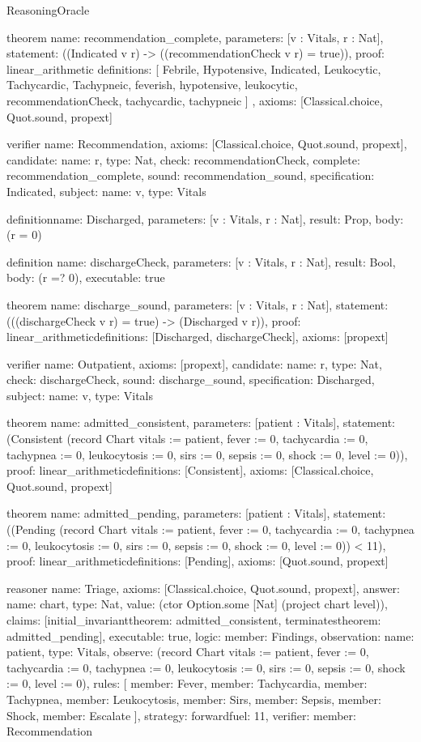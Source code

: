 \begin{lexlean}{ReasoningOracle}
\begin{semanticmodule}
theorem{
  name: recommendation_complete,
  parameters: [v : Vitals, r : Nat],
  statement: ((Indicated v r) -> ((recommendationCheck v r) = true)),
  proof: linear_arithmetic{
    definitions: [
      Febrile,
      Hypotensive,
      Indicated,
      Leukocytic,
      Tachycardic,
      Tachypneic,
      feverish,
      hypotensive,
      leukocytic,
      recommendationCheck,
      tachycardic,
      tachypneic
    ]
  },
  axioms: [Classical.choice, Quot.sound, propext]
}

verifier{
  name: Recommendation,
  axioms: [Classical.choice, Quot.sound, propext],
  candidate: {name: r, type: Nat},
  check: recommendationCheck,
  complete: recommendation_complete,
  sound: recommendation_sound,
  specification: Indicated,
  subject: {name: v, type: Vitals}
}

definition{name: Discharged, parameters: [v : Vitals, r : Nat], result: Prop, body: (r = 0)}

definition{
  name: dischargeCheck,
  parameters: [v : Vitals, r : Nat],
  result: Bool,
  body: (r =? 0),
  executable: true
}

theorem{
  name: discharge_sound,
  parameters: [v : Vitals, r : Nat],
  statement: (((dischargeCheck v r) = true) -> (Discharged v r)),
  proof: linear_arithmetic{definitions: [Discharged, dischargeCheck]},
  axioms: [propext]
}

verifier{
  name: Outpatient,
  axioms: [propext],
  candidate: {name: r, type: Nat},
  check: dischargeCheck,
  sound: discharge_sound,
  specification: Discharged,
  subject: {name: v, type: Vitals}
}

theorem{
  name: admitted_consistent,
  parameters: [patient : Vitals],
  statement: (Consistent (record Chart {vitals := patient, fever := 0, tachycardia := 0, tachypnea := 0, leukocytosis := 0, sirs := 0, sepsis := 0, shock := 0, level := 0})),
  proof: linear_arithmetic{definitions: [Consistent]},
  axioms: [Classical.choice, Quot.sound, propext]
}

theorem{
  name: admitted_pending,
  parameters: [patient : Vitals],
  statement: ((Pending (record Chart {vitals := patient, fever := 0, tachycardia := 0, tachypnea := 0, leukocytosis := 0, sirs := 0, sepsis := 0, shock := 0, level := 0})) < 11),
  proof: linear_arithmetic{definitions: [Pending]},
  axioms: [Quot.sound, propext]
}

reasoner{
  name: Triage,
  axioms: [Classical.choice, Quot.sound, propext],
  answer: {name: chart, type: Nat, value: (ctor Option.some [Nat] (project chart level))},
  claims: [initial_invariant{theorem: admitted_consistent}, terminates{theorem: admitted_pending}],
  executable: true,
  logic: {member: Findings},
  observation: {name: patient, type: Vitals},
  observe: (record Chart {vitals := patient, fever := 0, tachycardia := 0, tachypnea := 0, leukocytosis := 0, sirs := 0, sepsis := 0, shock := 0, level := 0}),
  rules: [
    {member: Fever},
    {member: Tachycardia},
    {member: Tachypnea},
    {member: Leukocytosis},
    {member: Sirs},
    {member: Sepsis},
    {member: Shock},
    {member: Escalate}
  ],
  strategy: forward{fuel: 11},
  verifier: {member: Recommendation}
}


\end{semanticmodule}
\end{lexlean}
